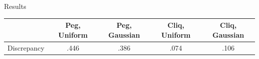 \documentclass{beamer}
\begin{document}
\begin{frame}{Results}
	\small
	\begin{center}
	\begin{tabular}{c|c|c|c|c}
		& Peg, Uniform & Peg, Gaussian & Cliq, Uniform & Cliq, Gaussian \\
		\hline
		Discrepancy & .446 &   .386 & .074 & .106 \\
	\end{tabular}
\end{center}
\end{frame}

\begin{frame}
	 
	
\end{frame}
\end{document}
